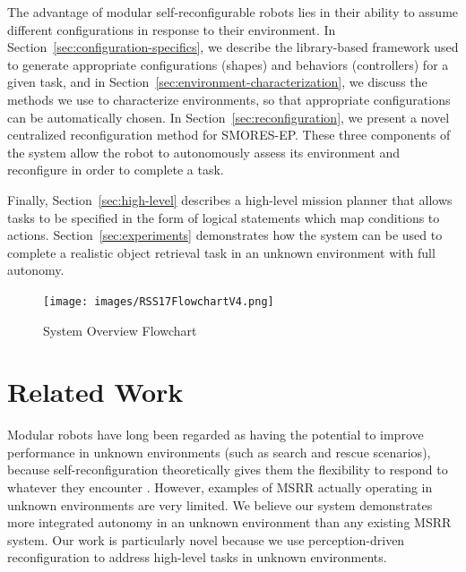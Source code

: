\documentclass[conference]{IEEEtran}
\begin{document}
The advantage of modular self-reconfigurable robots lies in their ability to assume different configurations in response to their environment.  In Section~\ref{sec:configuration-specifics}, we describe the library-based framework used to generate appropriate configurations (shapes) and behaviors (controllers) for a given task, and in Section~\ref{sec:environment-characterization}, we discuss the methods we use to characterize environments, so that appropriate configurations can be automatically chosen.  In Section~\ref{sec:reconfiguration}, we present a novel centralized reconfiguration method for SMORES-EP.  These three components of the system allow the robot to autonomously assess its environment and reconfigure in order to complete a task.

Finally, Section~\ref{sec:high-level} describes a high-level mission planner that allows tasks to be specified in the form of logical statements which map conditions to actions.  Section~\ref{sec:experiments} demonstrates how the system can be used to complete a realistic object retrieval task in an unknown environment with full autonomy. 
%
\begin{figure}
\begin{center}
\texttt{[image: images/RSS17FlowchartV4.png]}
\caption{System Overview Flowchart}
\label{fig:overview}
\end{center}
\end{figure} 
%

\section{Related Work}\label{sec:related-work}
%
%
Modular robots have long been regarded as having the potential to improve performance in unknown environments (such as search and rescue scenarios), because  self-reconfiguration theoretically gives them the flexibility to respond to whatever they encounter \cite{Yim2007a,yim2003modular}.  However, examples of MSRR actually operating in unknown environments are very limited. We believe our system demonstrates more integrated autonomy in an unknown environment than any existing MSRR system.  Our work is particularly novel because we use perception-driven reconfiguration to address high-level tasks in unknown environments.
\end{document}
